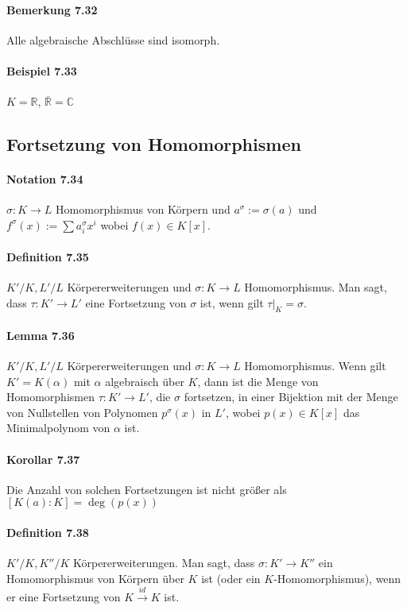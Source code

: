 \documentclass{scrartcl}
\newcommand{\q}[1]{\overline{#1}} %
\newcommand{\os}[2]{\overset{#1}{#2}} %
\newcommand{\R}{\mathbb{R}}
\newcommand{\C}{\mathbb{C}}
\begin{document}
\paragraph{Bemerkung 7.32}
Alle algebraische Abschlüsse sind isomorph.

\paragraph{Beispiel 7.33}
$K=\R$, $\q{\R}=\C$

\subsection{Fortsetzung von Homomorphismen}

\paragraph{Notation 7.34}
$\sigma : K \to L$ Homomorphismus von Körpern und $a^\sigma := \sigma(a)$ und
$f^\sigma(x) := \sum a_i^\sigma x^i$ wobei $f(x) \in K[x]$.

\paragraph{Definition 7.35}
$K'/K, L'/L$ Körpererweiterungen und $\sigma : K \to L$ Homomorphismus. Man
sagt, dass $\tau : K' \to L'$ eine Fortsetzung von $\sigma$ ist, wenn gilt $\tau
|_K = \sigma$. 

\paragraph{Lemma 7.36}
$K'/K, L'/L$ Körpererweiterungen und $\sigma : K \to L$ Homomorphismus. Wenn
gilt $K' = K(\alpha)$ mit $\alpha$ algebraisch über $K$, dann ist die Menge von
Homomorphismen $\tau : K' \to L'$, die $\sigma$ fortsetzen, in einer Bijektion
mit der Menge von Nullstellen von Polynomen $p^\sigma(x)$ in $L'$, wobei $p(x)
\in K[x]$ das Minimalpolynom von $\alpha$ ist.

\paragraph{Korollar 7.37}
Die Anzahl von solchen Fortsetzungen ist nicht größer als $[K(a):K] = \deg(p(x))$

\paragraph{Definition 7.38}
$K'/K, K''/K$ Körpererweiterungen. Man sagt, dass $\sigma : K' \to K''$ ein
Homomorphismus von Körpern über $K$ ist (oder ein $K$-Homomorphismus), wenn er
eine Fortsetzung von $K \os{id}{\to} K$ ist.
\end{document}
